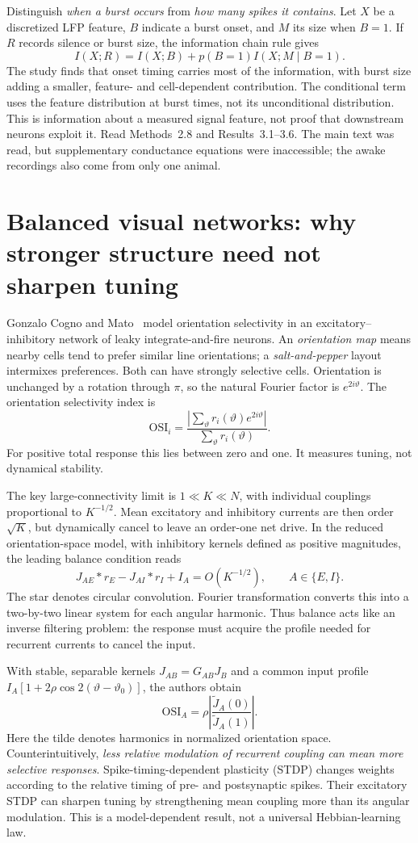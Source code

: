 \documentclass[11pt,a4paper]{article}
\begin{document}
Distinguish \emph{when a burst occurs} from \emph{how many spikes it contains}. Let $X$ be a discretized LFP feature, $B$ indicate a burst onset, and $M$ its size when $B=1$. If $R$ records silence or burst size, the information chain rule gives
\[I(X;R)=I(X;B)+p(B=1)I(X;M\mid B=1).\]
The study finds that onset timing carries most of the information, with burst size adding a smaller, feature- and cell-dependent contribution. The conditional term uses the feature distribution at burst times, not its unconditional distribution. This is information about a measured signal feature, not proof that downstream neurons exploit it. Read Methods~2.8 and Results~3.1--3.6. The main text was read, but supplementary conductance equations were inaccessible; the awake recordings also come from only one animal.

\section{Balanced visual networks: why stronger structure need not sharpen tuning}
Gonzalo Cogno and Mato~\cite{balance} model orientation selectivity in an excitatory--inhibitory network of leaky integrate-and-fire neurons. An \emph{orientation map} means nearby cells tend to prefer similar line orientations; a \emph{salt-and-pepper} layout intermixes preferences. Both can have strongly selective cells. Orientation is unchanged by a rotation through $\pi$, so the natural Fourier factor is $e^{2i\vartheta}$. The orientation selectivity index is
\[\mathrm{OSI}_i=\frac{\left|\sum_\vartheta r_i(\vartheta)e^{2i\vartheta}\right|}{\sum_\vartheta r_i(\vartheta)}.\]
For positive total response this lies between zero and one. It measures tuning, not dynamical stability.

The key large-connectivity limit is $1\ll K\ll N$, with individual couplings proportional to $K^{-1/2}$. Mean excitatory and inhibitory currents are then order $\sqrt K$, but dynamically cancel to leave an order-one net drive. In the reduced orientation-space model, with inhibitory kernels defined as positive magnitudes, the leading balance condition reads
\[J_{AE}*r_E-J_{AI}*r_I+I_A=O(K^{-1/2}),\qquad A\in\{E,I\}.\]
The star denotes circular convolution. Fourier transformation converts this into a two-by-two linear system for each angular harmonic. Thus balance acts like an inverse filtering problem: the response must acquire the profile needed for recurrent currents to cancel the input.

With stable, separable kernels $J_{AB}=G_{AB}J_B$ and a common input profile $I_A[1+2\rho\cos2(\vartheta-\vartheta_0)]$, the authors obtain
\[\mathrm{OSI}_A=\rho\left|\frac{\widetilde J_A(0)}{\widetilde J_A(1)}\right|.\]
Here the tilde denotes harmonics in normalized orientation space. Counterintuitively, \emph{less relative modulation of recurrent coupling can mean more selective responses}. Spike-timing-dependent plasticity (STDP) changes weights according to the relative timing of pre- and postsynaptic spikes. Their excitatory STDP can sharpen tuning by strengthening mean coupling more than its angular modulation. This is a model-dependent result, not a universal Hebbian-learning law.
\end{document}
